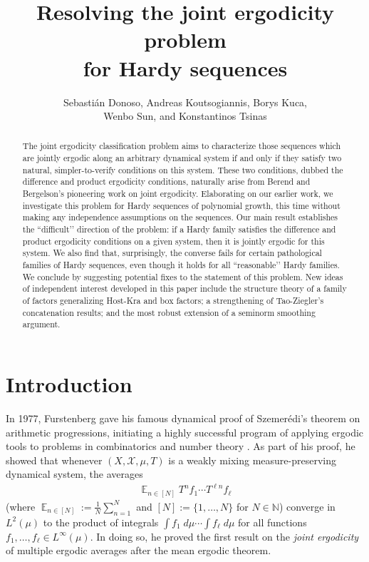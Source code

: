 \documentclass[11pt]{amsart}
\title[]{Resolving the joint ergodicity problem\\ for Hardy sequences}
\author{Sebasti\'an Donoso, Andreas Koutsogiannis, Borys Kuca,\\ Wenbo Sun, and Konstantinos Tsinas}
\theoremstyle{definition}
\DeclareMathOperator*{\E}{\mathbb{E}}
\newcommand{\N}{{\mathbb N}}
\newcommand{\CX}{{\mathcal X}}
\newcommand{\1}{{\mathbf{1}}}
\begin{document}
\begin{abstract}
    The joint ergodicity classification problem aims to characterize those sequences which are jointly ergodic along an arbitrary dynamical system if and only if they satisfy two natural, simpler-to-verify conditions on this system. These two conditions, dubbed the difference and product ergodicity conditions, naturally arise from Berend and Bergelson's pioneering work on joint ergodicity. Elaborating on our earlier work, we investigate this problem for Hardy sequences of polynomial growth, this time without making any independence assumptions on the sequences. Our main result establishes the ``difficult’’ direction of the problem: if a Hardy family satisfies the difference and product ergodicity conditions on a given system, then it is jointly ergodic for this system. We also find that, surprisingly, the converse fails for certain pathological families of Hardy sequences, even though it holds for all ``reasonable’’ Hardy families. We conclude by suggesting potential fixes to the statement of this problem. {New ideas of independent interest developed in this paper include the structure theory of a family of factors generalizing Host-Kra and box factors; a strengthening of Tao-Ziegler's concatenation results; and the most robust extension of a seminorm smoothing argument.}
\end{abstract}

\maketitle

\tableofcontents

\section{Introduction}


In 1977, Furstenberg gave his famous dynamical proof of Szemer\'edi's theorem on arithmetic progressions, initiating a highly successful program of applying ergodic tools to problems in combinatorics and number theory \cite{Fu77}. As part of his proof, he showed that whenever $(X, \CX, \mu, T)$ is a weakly mixing measure-preserving dynamical system, the averages
\begin{align*}
    \E_{n\in[N]}T^n f_1 \cdots T^{\ell n}f_\ell
\end{align*}
(where $\E_{n\in[N]}:=\frac{1}{N}\sum\limits_{n=1}^N$ {and $[N]:=\{1,\ldots,N\}$ for $N\in \N$}) converge in $L^2(\mu)$ to the product of integrals $\int f_1\; d\mu \cdots \int f_\ell\; d\mu$ for all functions $f_1, \ldots, f_\ell\in L^\infty(\mu)$. In doing so, he proved the first result on the \textit{joint ergodicity} of multiple ergodic averages {after the mean ergodic theorem}. 
\end{document}
